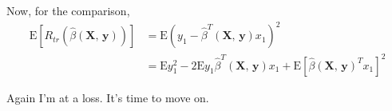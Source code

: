 \documentclass{article}
\begin{document}
Now, for the comparison,
\begin{align}
	\mathrm E[R_{tr}(\hat{\beta}(\mathbf X,\,\mathbf y))]&=\mathrm E\left(y_1-\hat{\beta}^T(\mathbf X,\,\mathbf y)x_1\right)^2\\
	&=\mathrm Ey_1^2-2\mathrm Ey_1\hat{\beta}^T(\mathbf X,\,\mathbf y)x_1+\mathrm E\left[\hat{\beta}(\mathbf X,\,\mathbf y)^Tx_1\right]^2
\end{align}

Again I'm at a loss. It's time to move on.
\end{document}
